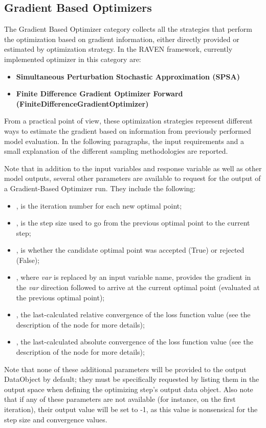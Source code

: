 \subsection{Gradient Based Optimizers}
\label{subsec:gradientBasedOptimizers}
The Gradient Based Optimizer category collects all the strategies that perform the optimization based on gradient information,
 either directly provided or estimated by optimization strategy. In the RAVEN framework, currently implemented optimizer in this
 category are:
\begin{itemize}
\item \textbf{Simultaneous Perturbation Stochastic Approximation (SPSA)}
\item \textbf{Finite Difference Gradient Optimizer Forward (FiniteDifferenceGradientOptimizer)}
\end{itemize}

From a practical point of view, these optimization strategies represent different ways to estimate the gradient based on information
from previously performed model evaluation. In the following paragraphs, the input requirements and a small explanation of the
different sampling methodologies are reported.

Note that in addition to the input variables and response variable as well as other model outputs, several
other parameters are available to
request for the output of a Gradient-Based Optimizer run.  They include the following:
\begin{itemize}
  \item {}, is the iteration number for each new optimal point;
  \item {}, is the step size used to go from the previous optimal point to the current step;
  \item {}, is whether the candidate optimal point was accepted (True) or rejected (False);
  \item {}, where \emph{var} is replaced by an input variable name, provides the
    gradient in the \emph{var} direction followed to arrive at the current optimal point (evaluated at the
    previous optimal point);
  \item {}, the last-calculated relative convergence of the loss function value
    (see the description of the  node for more details);
  \item {}, the last-calculated absolute convergence of the loss function value
    (see the description of the  node for more details);
\end{itemize}
Note that none of these additional parameters will be provided to the output DataObject by default; they must
be specifically requested by listing them in the output space when defining the optimizing step's output data
object.  Also note that if any of these parameters are not available (for instance, on the first iteration),
their output value will be set to -1, as this value is nonsensical for the step size and convergence values.

